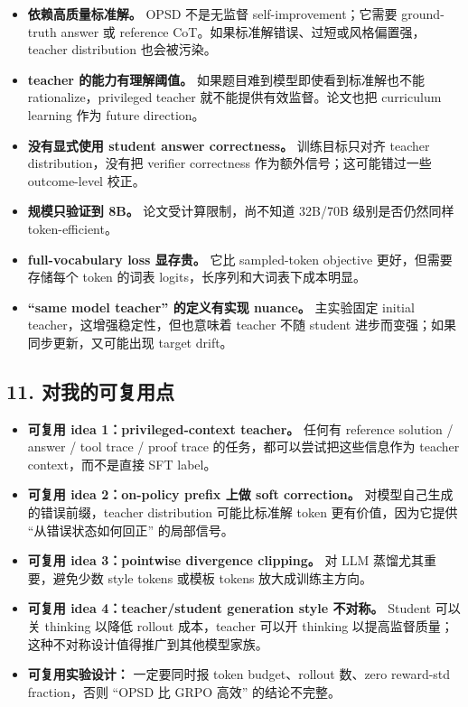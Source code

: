 \begin{itemize}[leftmargin=1.5em]
  \item \textbf{依赖高质量标准解。} OPSD 不是无监督 self-improvement；它需要 ground-truth answer 或 reference CoT。如果标准解错误、过短或风格偏置强，teacher distribution 也会被污染。
  \item \textbf{teacher 的能力有理解阈值。} 如果题目难到模型即使看到标准解也不能 rationalize，privileged teacher 就不能提供有效监督。论文也把 curriculum learning 作为 future direction。
  \item \textbf{没有显式使用 student answer correctness。} 训练目标只对齐 teacher distribution，没有把 verifier correctness 作为额外信号；这可能错过一些 outcome-level 校正。
  \item \textbf{规模只验证到 8B。} 论文受计算限制，尚不知道 32B/70B 级别是否仍然同样 token-efficient。
  \item \textbf{full-vocabulary loss 显存贵。} 它比 sampled-token objective 更好，但需要存储每个 token 的词表 logits，长序列和大词表下成本明显。
  \item \textbf{``same model teacher'' 的定义有实现 nuance。} 主实验固定 initial teacher，这增强稳定性，但也意味着 teacher 不随 student 进步而变强；如果同步更新，又可能出现 target drift。
\end{itemize}

\subsection{11. 对我的可复用点}

\begin{itemize}[leftmargin=1.5em]
  \item \textbf{可复用 idea 1：privileged-context teacher。} 任何有 reference solution / answer / tool trace / proof trace 的任务，都可以尝试把这些信息作为 teacher context，而不是直接 SFT label。
  \item \textbf{可复用 idea 2：on-policy prefix 上做 soft correction。} 对模型自己生成的错误前缀，teacher distribution 可能比标准解 token 更有价值，因为它提供 ``从错误状态如何回正'' 的局部信号。
  \item \textbf{可复用 idea 3：pointwise divergence clipping。} 对 LLM 蒸馏尤其重要，避免少数 style tokens 或模板 tokens 放大成训练主方向。
  \item \textbf{可复用 idea 4：teacher/student generation style 不对称。} Student 可以关 thinking 以降低 rollout 成本，teacher 可以开 thinking 以提高监督质量；这种不对称设计值得推广到其他模型家族。
  \item \textbf{可复用实验设计：} 一定要同时报 token budget、rollout 数、zero reward-std fraction，否则 ``OPSD 比 GRPO 高效'' 的结论不完整。
\end{itemize}

